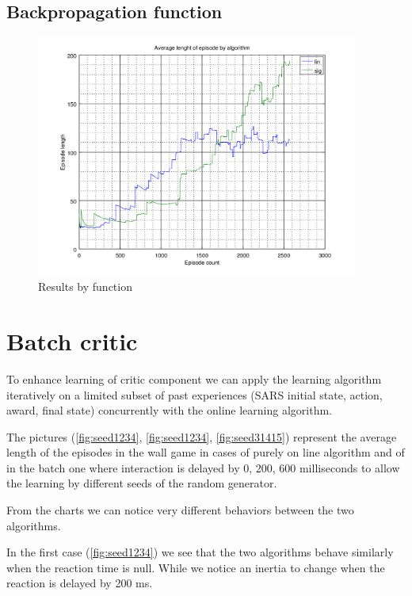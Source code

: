 \documentclass[a4paper,11pt]{article}
\begin{document}
\subsection{Backpropagation function}

\begin{figure}
	\label{fig:algo}
	\includegraphics[width=300pt]{algo}
	\caption{Results by function}
\end{figure}


\section{Batch critic}

To enhance learning of critic component we can apply
the learning algorithm iteratively on a limited subset
of past experiences (SARS initial state, action, award, final state)
concurrently with the online learning algorithm.

The pictures (\ref{fig:seed1234}, \ref{fig:seed1234}, \ref{fig:seed31415}) represent the average length of the episodes in
the wall game in cases of purely on line algorithm  and
of in the batch one where interaction is delayed by 0, 200, 600 milliseconds
to allow the learning by different seeds of the random generator.

From the charts we can notice very different behaviors between the two algorithms.

In the first case (\ref{fig:seed1234}) we see that the two algorithms behave similarly when the reaction time is null.
While we notice an inertia to change when the reaction is delayed by 200 ms.
\end{document}
